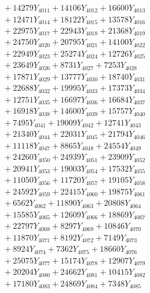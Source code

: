 \documentclass[a4paper,10pt]{article}
\begin{document}
{\begin{align}
&\;  + 14279 Y_{4011} + 14106 Y_{4012} + 16600 Y_{4013} \\[0.3ex]
&\;  + 12471 Y_{4014} + 18122 Y_{4015} + 13578 Y_{4016} \\[0.3ex]
&\;  + 22975 Y_{4017} + 22943 Y_{4018} + 21368 Y_{4019} \\[0.5ex]\allowbreak
&\;  + 24750 Y_{4020} + 20795 Y_{4021} + 14100 Y_{4022} \\[0.3ex]
&\;  + 22949 Y_{4023} + 25274 Y_{4024} + 12726 Y_{4025} \\[0.3ex]
&\;  + 23649 Y_{4026} + 8731 Y_{4027} + 7253 Y_{4028} \\[0.3ex]
&\;  + 17871 Y_{4029} + 13777 Y_{4030} + 18740 Y_{4031} \\[0.3ex]
&\;  + 22688 Y_{4032} + 19995 Y_{4033} + 17373 Y_{4034} \\[0.3ex]
&\;  + 12751 Y_{4035} + 16697 Y_{4036} + 16684 Y_{4037} \\[0.3ex]
&\;  + 16918 Y_{4038} + 14600 Y_{4039} + 15757 Y_{4040} \\[0.3ex]
&\;  + 7495 Y_{4041} + 19009 Y_{4042} + 12741 Y_{4043} \\[0.3ex]
&\;  + 21340 Y_{4044} + 22031 Y_{4045} + 21794 Y_{4046} \\[0.3ex]
&\;  + 11118 Y_{4047} + 8865 Y_{4048} + 24554 Y_{4049} \\[0.5ex]\allowbreak
&\;  + 24260 Y_{4050} + 24939 Y_{4051} + 23909 Y_{4052} \\[0.3ex]
&\;  + 20941 Y_{4053} + 19003 Y_{4054} + 17532 Y_{4055} \\[0.3ex]
&\;  + 11050 Y_{4056} + 11720 Y_{4057} + 19105 Y_{4058} \\[0.3ex]
&\;  + 24592 Y_{4059} + 22415 Y_{4060} + 19875 Y_{4061} \\[0.3ex]
&\;  + 6562 Y_{4062} + 11890 Y_{4063} + 20808 Y_{4064} \\[0.3ex]
&\;  + 15585 Y_{4065} + 12609 Y_{4066} + 18869 Y_{4067} \\[0.3ex]
&\;  + 22797 Y_{4068} + 8297 Y_{4069} + 10846 Y_{4070} \\[0.3ex]
&\;  + 11870 Y_{4071} + 8192 Y_{4072} + 7149 Y_{4073} \\[0.3ex]
&\;  + 8924 Y_{4074} + 7362 Y_{4075} + 18660 Y_{4076} \\[0.3ex]
&\;  + 25075 Y_{4077} + 15174 Y_{4078} + 12907 Y_{4079} \\[0.5ex]\allowbreak
&\;  + 20204 Y_{4080} + 24662 Y_{4081} + 10415 Y_{4082} \\[0.3ex]
&\;  + 17180 Y_{4083} + 24869 Y_{4084} + 7348 Y_{4085} \\[0.3ex]

\end{align}}
\end{document}
